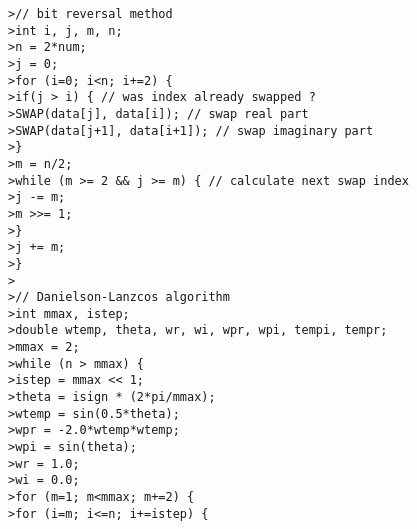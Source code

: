 \addvspace{12pt}

\texttt{>\quad // bit reversal method} \\
\texttt{>\quad int i, j, m, n;} \\
\texttt{>\quad n = 2*num;} \\
\texttt{>\quad j = 0;} \\
\texttt{>\quad for (i=0; i<n; i+=2) \{} \\
\texttt{>\quad \qquad if(j > i) \{   // was index already swapped ?} \\
\texttt{>\quad \qquad\qquad SWAP(data[j], data[i]);   // swap real part} \\
\texttt{>\quad \qquad\qquad SWAP(data[j+1], data[i+1]);   // swap imaginary part} \\
\texttt{>\quad \qquad \}} \\
\texttt{>\quad \qquad m = n/2;} \\
\texttt{>\quad \qquad while (m >= 2 \&\& j >= m) \{  // calculate next swap index} \\
\texttt{>\quad \qquad\qquad j -= m;} \\
\texttt{>\quad \qquad\qquad m >>= 1;} \\
\texttt{>\quad \qquad \}} \\
\texttt{>\quad \qquad j += m;} \\
\texttt{>\quad \}} \\
\texttt{>\quad } \\
\texttt{>\quad // Danielson-Lanzcos algorithm} \\
\texttt{>\quad int mmax, istep;} \\
\texttt{>\quad double wtemp, theta, wr, wi, wpr, wpi, tempi, tempr;} \\
\texttt{>\quad mmax = 2;} \\
\texttt{>\quad while (n > mmax) \{} \\
\texttt{>\quad \qquad istep = mmax << 1;} \\
\texttt{>\quad \qquad theta = isign * (2*pi/mmax);} \\
\texttt{>\quad \qquad wtemp = sin(0.5*theta);} \\
\texttt{>\quad \qquad wpr = -2.0*wtemp*wtemp;} \\
\texttt{>\quad \qquad wpi = sin(theta);} \\
\texttt{>\quad \qquad wr = 1.0;} \\
\texttt{>\quad \qquad wi = 0.0;} \\
\texttt{>\quad \qquad for (m=1; m<mmax; m+=2) \{} \\
\texttt{>\quad \qquad\qquad for (i=m; i<=n; i+=istep) \{} \\
